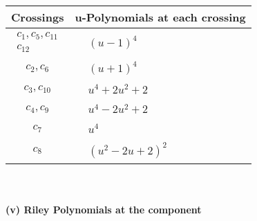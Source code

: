 \documentclass[1p]{elsarticle_modified}
\theoremstyle{definition}
\begin{document}
\begin{tabular}{m{50pt}|m{274pt}}
Crossings & \hspace{64pt}u-Polynomials at each crossing \\
\hline $$\begin{aligned}c_{1},c_{5},c_{11}\\c_{12}\end{aligned}$$&$\begin{aligned}
&(u-1)^4
\end{aligned}$\\
\hline $$\begin{aligned}c_{2},c_{6}\end{aligned}$$&$\begin{aligned}
&(u+1)^4
\end{aligned}$\\
\hline $$\begin{aligned}c_{3},c_{10}\end{aligned}$$&$\begin{aligned}
&u^4+2 u^2+2
\end{aligned}$\\
\hline $$\begin{aligned}c_{4},c_{9}\end{aligned}$$&$\begin{aligned}
&u^4-2 u^2+2
\end{aligned}$\\
\hline $$\begin{aligned}c_{7}\end{aligned}$$&$\begin{aligned}
&u^4
\end{aligned}$\\
\hline $$\begin{aligned}c_{8}\end{aligned}$$&$\begin{aligned}
&(u^2-2 u+2)^2
\end{aligned}$\\
\hline
\end{tabular}\\~\\
\newpage\renewcommand{\arraystretch}{1}
\flushleft \textbf{(v) Riley Polynomials at the component}\newline \\
\end{document}
